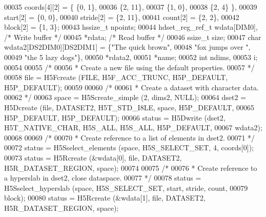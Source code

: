 \begin{DoxyCode}
00035                         coords[4][2] = \{ \{0,  1\},
00036                                          \{2, 11\},
00037                                          \{1,  0\},
00038                                          \{2,  4\} \},
00039                         start[2] = \{0, 0\},
00040                         stride[2] = \{2, 11\},
00041                         count[2] = \{2, 2\},
00042                         block[2] = \{1, 3\};
00043     hssize\_t            npoints;
00044     hdset\_reg\_ref\_t     wdata[DIM0],                \textcolor{comment}{/* Write buffer */}
00045                         *rdata;                     \textcolor{comment}{/* Read buffer */}
00046     ssize\_t             size;
00047     \textcolor{keywordtype}{char}                wdata2[DS2DIM0][DS2DIM1] = \{\textcolor{stringliteral}{"The quick brown"},
00048                                                     \textcolor{stringliteral}{"fox jumps over "},
00049                                                     \textcolor{stringliteral}{"the 5 lazy dogs"}\},
00050                         *rdata2,
00051                         *name;
00052     \textcolor{keywordtype}{int}                 ndims,
00053                         i;
00054 
00055     \textcolor{comment}{/*}
00056 \textcolor{comment}{     * Create a new file using the default properties.}
00057 \textcolor{comment}{     */}
00058     file = H5Fcreate (FILE, H5F\_ACC\_TRUNC, H5P\_DEFAULT, H5P\_DEFAULT);
00059 
00060     \textcolor{comment}{/*}
00061 \textcolor{comment}{     * Create a dataset with character data.}
00062 \textcolor{comment}{     */}
00063     space = H5Screate\_simple (2, dims2, NULL);
00064     dset2 = H5Dcreate (file, DATASET2, H5T\_STD\_I8LE, space, H5P\_DEFAULT,
00065                 H5P\_DEFAULT, H5P\_DEFAULT);
00066     status = H5Dwrite (dset2, H5T\_NATIVE\_CHAR, H5S\_ALL, H5S\_ALL, H5P\_DEFAULT,
00067                 wdata2);
00068 
00069     \textcolor{comment}{/*}
00070 \textcolor{comment}{     * Create reference to a list of elements in dset2.}
00071 \textcolor{comment}{     */}
00072     status = H5Sselect\_elements (space, H5S\_SELECT\_SET, 4, coords[0]);
00073     status = H5Rcreate (&wdata[0], file, DATASET2, H5R\_DATASET\_REGION, space);
00074 
00075     \textcolor{comment}{/*}
00076 \textcolor{comment}{     * Create reference to a hyperslab in dset2, close dataspace.}
00077 \textcolor{comment}{     */}
00078     status = H5Sselect\_hyperslab (space, H5S\_SELECT\_SET, start, stride, count,
00079                 block);
00080     status = H5Rcreate (&wdata[1], file, DATASET2, H5R\_DATASET\_REGION, space);

\end{DoxyCode}
